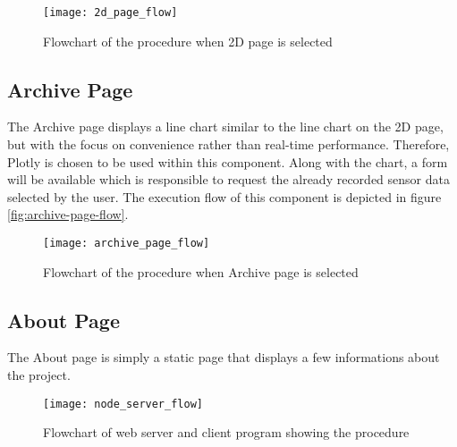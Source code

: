 \begin{figure}[H]
    \centering
    \texttt{[image: 2d\_page\_flow]}
    \caption{Flowchart of the procedure when 2D page is selected}
    \label{fig:2d-page-flow}
\end{figure}

\subsection{Archive Page}
The Archive page displays a line chart similar to the line chart on the 2D page, but with the focus on convenience rather than real-time performance. Therefore, Plotly is chosen to be used within this component. Along with the chart, a form will be available which is responsible to request the already recorded sensor data selected by the user. The execution flow of this component is depicted in figure \vref{fig:archive-page-flow}.

\begin{figure}[h]
    \centering
    \texttt{[image: archive\_page\_flow]}
    \caption{Flowchart of the procedure when Archive page is selected}
    \label{fig:archive-page-flow}
\end{figure}

\subsection{About Page}
The About page is simply a static page that displays a few informations about the project.

\begin{figure}[h]
    \centering
    \texttt{[image: node\_server\_flow]}
    \caption{Flowchart of web server and client program showing the procedure}
    \label{fig:webserver-program-flow}
\end{figure}
